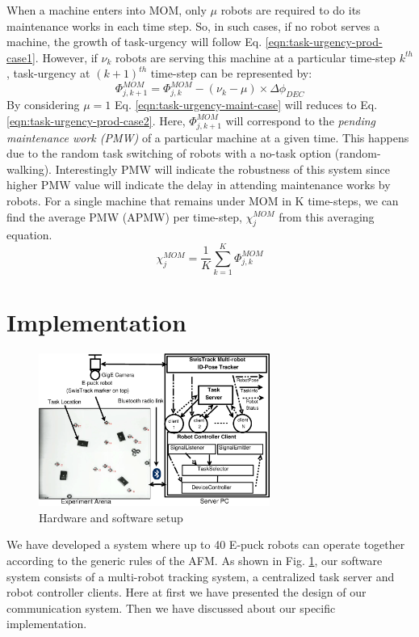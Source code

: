 \documentclass{llncs}
\begin{document}
When a machine enters into MOM, only $\mu$ robots are required to do its maintenance works in each time step. So, in such cases, if no robot serves a machine, the growth of task-urgency will follow Eq. \ref{eqn:task-urgency-prod-case1}. However, if $\nu_{k}$ robots are serving this machine at a particular time-step $k^{th}$ , task-urgency at $(k+1)^{th}$ time-step can be represented by:
\begin{equation}
\Phi_{j, k+1}^{MOM} = \Phi_{j, k}^{MOM}- (\nu_{k} - \mu) \times \Delta \phi_{DEC}
\label{eqn:task-urgency-maint-case}
\end{equation}
By considering $\mu = 1$ Eq. \ref{eqn:task-urgency-maint-case} will reduces to Eq. \ref{eqn:task-urgency-prod-case2}. Here, $\Phi_{j, k+1}^{MOM}$ will correspond to the {\em pending maintenance work (PMW)} of a particular machine at a given time. This happens due to the random task switching of robots with a no-task option (random-walking). Interestingly PMW will indicate the robustness of this system since higher PMW value will indicate the delay in attending maintenance works by robots. For a single machine that remains under MOM in K time-steps, we can find the average PMW (APMW) per time-step, $\chi_{j}^{MOM}$ from this averaging equation. 
\begin{equation}
\chi_{j}^{MOM}= \frac{1}{K} \sum_{k=1}^{K} \Phi_{j, k}^{MOM}
\label{eqn:sigle-pmw}
\end{equation}

\section{Implementation}
\label{sec:impl}
\begin{figure}
\centering
\includegraphics[height=5cm, angle=0]
{../dia-files/RIL-Expt-Setup1.eps}
\caption{\small Hardware and software setup}
\label{fig:setup} %
\end{figure}
We have developed a system where up to 40 E-puck robots \cite{Epuck} can operate together according to the generic rules of the AFM. As shown in Fig. \ref{fig:setup}, our software system consists of a multi-robot tracking system, a centralized task server and robot controller clients. Here at first we have presented the design of our communication system. Then we have discussed about our specific implementation. 
\end{document}
